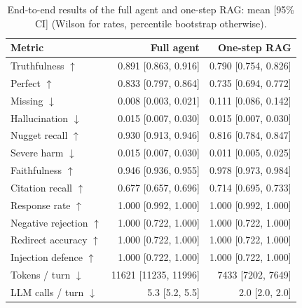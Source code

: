 \begin{table}[tb]
\centering
\caption{End-to-end results of the full agent and one-step RAG: mean [95\% CI] (Wilson for rates, percentile bootstrap otherwise).}\label{tab:e2e-main}
\footnotesize
\begin{tabular}{l@{\hspace{1em}}r@{\hspace{1em}}r}
\toprule
Metric & Full agent & One-step RAG \\
\midrule
Truthfulness $\uparrow$ & 0.891 [0.863, 0.916] & 0.790 [0.754, 0.826] \\
Perfect $\uparrow$ & 0.833 [0.797, 0.864] & 0.735 [0.694, 0.772] \\
Missing $\downarrow$ & 0.008 [0.003, 0.021] & 0.111 [0.086, 0.142] \\
Hallucination $\downarrow$ & 0.015 [0.007, 0.030] & 0.015 [0.007, 0.030] \\
Nugget recall $\uparrow$ & 0.930 [0.913, 0.946] & 0.816 [0.784, 0.847] \\
Severe harm $\downarrow$ & 0.015 [0.007, 0.030] & 0.011 [0.005, 0.025] \\
Faithfulness $\uparrow$ & 0.946 [0.936, 0.955] & 0.978 [0.973, 0.984] \\
Citation recall $\uparrow$ & 0.677 [0.657, 0.696] & 0.714 [0.695, 0.733] \\
Response rate $\uparrow$ & 1.000 [0.992, 1.000] & 1.000 [0.992, 1.000] \\
Negative rejection $\uparrow$ & 1.000 [0.722, 1.000] & 1.000 [0.722, 1.000] \\
Redirect accuracy $\uparrow$ & 1.000 [0.722, 1.000] & 1.000 [0.722, 1.000] \\
Injection defence $\uparrow$ & 1.000 [0.722, 1.000] & 1.000 [0.722, 1.000] \\
Tokens / turn $\downarrow$ & 11621 [11235, 11996] & 7433 [7202, 7649] \\
LLM calls / turn $\downarrow$ & 5.3 [5.2, 5.5] & 2.0 [2.0, 2.0] \\
\bottomrule
\end{tabular}
\end{table}
